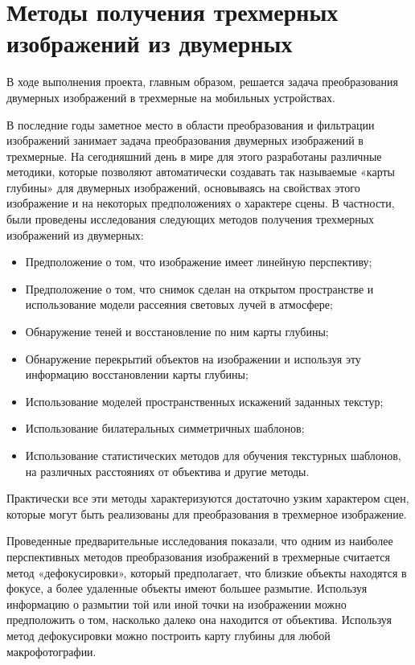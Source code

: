 
\section{Методы получения трехмерных изображений из двумерных}

В ходе выполнения проекта, главным образом, решается задача преобразования двумерных изображений в трехмерные на мобильных устройствах.

В последние годы заметное место в области преобразования и фильтрации изображений занимает задача преобразования двумерных изображений в трехмерные. На сегодняшний день в мире для этого разработаны различные методики, которые позволяют автоматически создавать так называемые «карты глубины»\cite{depthMap3} для двумерных изображений, основываясь на свойствах этого изображение и на некоторых предположениях о характере сцены.  В частности, были проведены исследования следующих методов получения трехмерных изображений из двумерных:

\begin{itemize}
	\item Предположение о том, что изображение имеет линейную перспективу;
	\item Предположение о том, что снимок сделан на открытом пространстве и использование модели рассеяния световых лучей в атмосфере;
	\item Обнаружение теней и восстановление по ним карты глубины;
	\item Обнаружение перекрытий объектов на изображении и используя эту информацию восстановлении карты глубины;
	\item Использование моделей пространственных искажений заданных текстур;
	\item Использование билатеральных симметричных шаблонов;
	\item Использование статистических методов для обучения текстурных шаблонов, на различных расстояниях от объектива и другие методы.
\end{itemize}

Практически все эти методы характеризуются достаточно узким характером сцен, которые могут быть реализованы для преобразования в трехмерное изображение. 

Проведенные предварительные исследования показали, что одним из наиболее перспективных методов преобразования изображений в трехмерные считается метод «дефокусировки», который предполагает, что близкие объекты находятся в фокусе, а более удаленные объекты имеют большее размытие. Используя информацию о размытии той или иной точки на изображении можно предположить о том, насколько далеко она находится от объектива.  Используя метод дефокусировки можно построить карту глубины для любой макрофотографии. 

